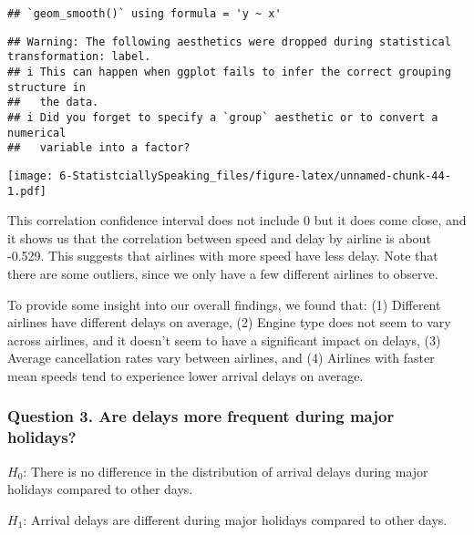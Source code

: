 \documentclass[
]{article}
\begin{document}
\begin{verbatim}
## `geom_smooth()` using formula = 'y ~ x'
\end{verbatim}

\begin{verbatim}
## Warning: The following aesthetics were dropped during statistical transformation: label.
## i This can happen when ggplot fails to infer the correct grouping structure in
##   the data.
## i Did you forget to specify a `group` aesthetic or to convert a numerical
##   variable into a factor?
\end{verbatim}

\texttt{[image: 6-StatistciallySpeaking\_files/figure-latex/unnamed-chunk-44-1.pdf]}

This correlation confidence interval does not include 0 but it does come
close, and it shows us that the correlation between speed and delay by
airline is about -0.529. This suggests that airlines with more speed
have less delay. Note that there are some outliers, since we only have a
few different airlines to observe.

To provide some insight into our overall findings, we found that: (1)
Different airlines have different delays on average, (2) Engine type
does not seem to vary across airlines, and it doesn't seem to have a
significant impact on delays, (3) Average cancellation rates vary
between airlines, and (4) Airlines with faster mean speeds tend to
experience lower arrival delays on average.

\newpage

\subsubsection{Question 3. Are delays more frequent during major
holidays?}\label{question-3.-are-delays-more-frequent-during-major-holidays}

\(H_0\): There is no difference in the distribution of arrival delays
during major holidays compared to other days.

\(H_1\): Arrival delays are different during major holidays compared to
other days.
\end{document}
